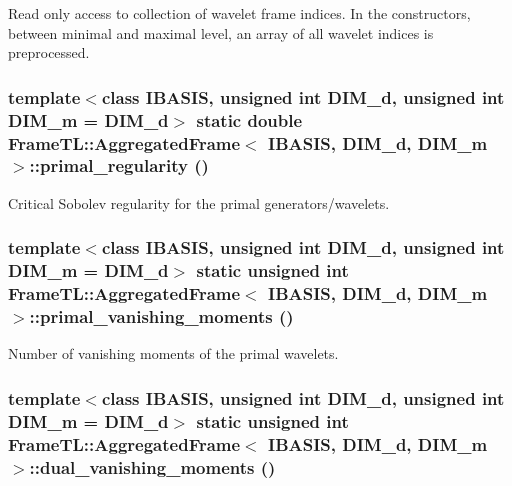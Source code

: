 Read only access to collection of wavelet frame indices. In the constructors, between minimal and maximal level, an array of all wavelet indices is preprocessed. \hypertarget{classFrameTL_1_1AggregatedFrame_eed976f2ee6c11cfae388c80fffa5fce}{
\subsubsection[primal\_\-regularity]{\setlength{\rightskip}{0pt plus 5cm}template$<$class IBASIS, unsigned int DIM\_\-d, unsigned int DIM\_\-m = DIM\_\-d$>$ static double {\bf FrameTL::AggregatedFrame}$<$ IBASIS, DIM\_\-d, DIM\_\-m $>$::primal\_\-regularity ()}}
\label{classFrameTL_1_1AggregatedFrame_eed976f2ee6c11cfae388c80fffa5fce}


Critical Sobolev regularity for the primal generators/wavelets. \hypertarget{classFrameTL_1_1AggregatedFrame_3057372270397c20f4705ac9281478e3}{
\subsubsection[primal\_\-vanishing\_\-moments]{\setlength{\rightskip}{0pt plus 5cm}template$<$class IBASIS, unsigned int DIM\_\-d, unsigned int DIM\_\-m = DIM\_\-d$>$ static unsigned int {\bf FrameTL::AggregatedFrame}$<$ IBASIS, DIM\_\-d, DIM\_\-m $>$::primal\_\-vanishing\_\-moments ()}}
\label{classFrameTL_1_1AggregatedFrame_3057372270397c20f4705ac9281478e3}


Number of vanishing moments of the primal wavelets. \hypertarget{classFrameTL_1_1AggregatedFrame_2716c6746c81fa02f22a43ef43b98ffc}{
\subsubsection[dual\_\-vanishing\_\-moments]{\setlength{\rightskip}{0pt plus 5cm}template$<$class IBASIS, unsigned int DIM\_\-d, unsigned int DIM\_\-m = DIM\_\-d$>$ static unsigned int {\bf FrameTL::AggregatedFrame}$<$ IBASIS, DIM\_\-d, DIM\_\-m $>$::dual\_\-vanishing\_\-moments ()}}
\label{classFrameTL_1_1AggregatedFrame_2716c6746c81fa02f22a43ef43b98ffc}


